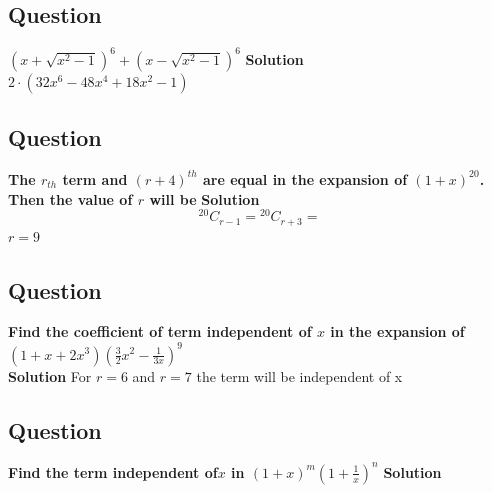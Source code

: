 \documentclass[12pt]{article}
\begin{document}
\subsection*{Question}
\textbf{$(x+\sqrt{x^2-1})^6+(x-\sqrt{x^2-1})^6$}
\textbf{Solution}\\
$2\cdot(32x^6-48x^4+18x^2-1)$

\subsection*{Question}
\textbf{The $r_{th}$ term and $(r+4)^{th}$ are equal in the expansion of $(1+x)^{20}$. Then the value of $r$ will be}
\textbf{Solution}
\[
{}^{20}C_{r-1} = {}^{20}C_{r+3} = 
\]
$r=9$

\subsection*{Question}
\textbf{Find the coefficient of term independent of $x$ in the expansion of\\ $(1+x+2x^3)(\frac{3}{2}x^2-\frac{1}{3x})^9$} \\
\textbf{Solution}
For $r=6$ and $r=7$ the term will be independent of x

\subsection*{Question}
\textbf{Find the term independent of$x$ in $(1+x)^m(1+\frac{1}{x})^n$}
\textbf{Solution}
\end{document}
